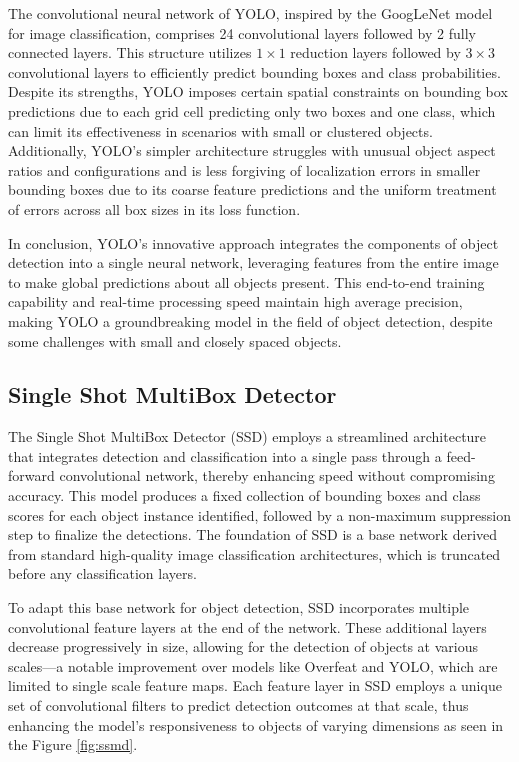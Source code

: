 The convolutional neural network of YOLO, inspired by the GoogLeNet model for image classification, comprises 24 convolutional layers followed by 2 fully 
connected layers. This structure utilizes \(1 \times 1\) reduction layers followed by \(3 \times 3\) convolutional layers to efficiently predict bounding 
boxes and class probabilities. Despite its strengths, YOLO imposes certain spatial constraints on bounding box predictions due to each grid cell predicting 
only two boxes and one class, which can limit its effectiveness in scenarios with small or clustered objects. Additionally, YOLO's simpler architecture 
struggles with unusual object aspect ratios and configurations and is less forgiving of localization errors in smaller bounding boxes due to its coarse 
feature predictions and the uniform treatment of errors across all box sizes in its loss function.

In conclusion, YOLO’s innovative approach integrates the components of object detection into a single neural network, leveraging features from the entire 
image to make global predictions about all objects present. This end-to-end training capability and real-time processing speed maintain high average 
precision, making YOLO a groundbreaking model in the field of object detection, despite some challenges with small and closely spaced objects.

\newpage
\subsection{Single Shot MultiBox Detector}

The Single Shot MultiBox Detector (SSD) \cite{ssd} employs a streamlined architecture that integrates detection and classification into a single pass through a 
feed-forward convolutional network, thereby enhancing speed without compromising accuracy. This model produces a fixed collection of bounding boxes and 
class scores for each object instance identified, followed by a non-maximum suppression step to finalize the detections. The foundation of SSD is a 
base network derived from standard high-quality image classification architectures, which is truncated before any classification layers. 

To adapt this base network for object detection, SSD incorporates multiple convolutional feature layers at the end of the network. These additional layers 
decrease progressively in size, allowing for the detection of objects at various scales—a notable improvement over models like Overfeat and YOLO, which 
are limited to single scale feature maps. Each feature layer in SSD employs a unique set of convolutional filters to predict detection outcomes at that scale, 
thus enhancing the model's responsiveness to objects of varying dimensions as seen in the Figure \ref{fig:ssmd}.

